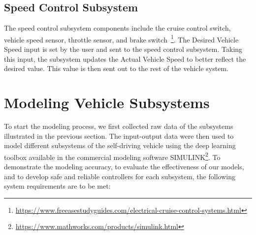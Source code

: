 \documentclass[conference]{IEEEtran}
\begin{document}
  \subsection{Speed Control Subsystem}
  The speed control subsystem components include the cruise control switch, vehicle speed sensor, throttle sensor, and brake switch~\footnote{\url{https://www.freeasestudyguides.com/electrical-cruise-control-systems.html}}. %
  The Desired Vehicle Speed input is set by the user and sent to the speed control subsystem. Taking this input, the subsystem updates the Actual Vehicle Speed to better reflect the desired value. This value is then sent out to the rest of the vehicle system.



\section{Modeling Vehicle Subsystems}

To start the modeling process, we first collected raw data of the subsystems illustrated in the previous section. The input-output data were then used to model different subsystems of the self-driving vehicle using the deep learning toolbox available in the commercial modeling software SIMULINK\footnote{\url{https://www.mathworks.com/products/simulink.html}}. To demonstrate the modeling accuracy, to evaluate the effectiveness of our models, and to develop safe and reliable controllers for each subsystem, the following system requirements are to be met:
\end{document}
